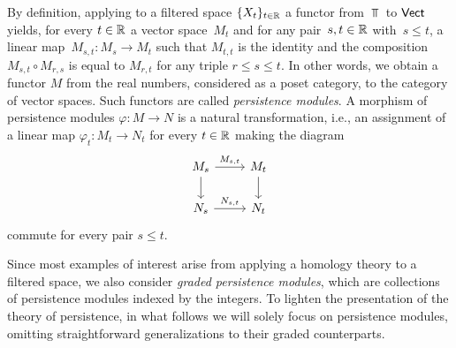 By definition, applying to a filtered space $\{X_t\}_{t \in \mathbb{R}}$ a functor from $\Top$ to $\mathsf{Vect}$ yields, for every $t \in \mathbb{R}$ a vector space~$M_t$ and for any pair~$s, t \in \mathbb{R}$ with~$s \leq t$, a linear map~$M_{s,t} \colon M_s \to M_t$ such that $M_{t,t}$ is the identity and the composition $M_{s,t} \circ M_{r,s}$ is equal to $M_{r,t}$ for any triple $r \leq s \leq t$.
In other words, we obtain a functor $M$ from the real numbers, considered as a poset category, to the category of vector spaces.
Such functors are called \emph{persistence modules}.
A morphism of persistence modules $\varphi \colon M \to N$ is a natural transformation, i.e., an assignment of a linear map $\varphi_t \colon M_t \to N_t$ for every $t \in \mathbb{R}$ making the diagram
\begin{equation*}
\begin{tikzcd}
M_{s} \arrow[r, "M_{s,t}"] \arrow[d] & M_{t} \arrow[d] \\
N_{s} \arrow[r, "N_{s,t}"] & N_{t}
\end{tikzcd}
\end{equation*}
commute for every pair $s \leq t$.

Since most examples of interest arise from applying a homology theory to a filtered space, we also consider \emph{graded persistence modules}, which are collections of persistence modules indexed by the integers.
To lighten the presentation of the theory of persistence, in what follows we will solely focus on persistence modules, omitting straightforward generalizations to their graded counterparts.


